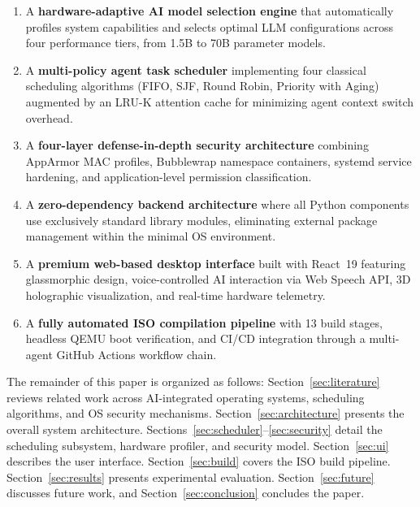 \documentclass[conference]{IEEEtran}
\begin{document}
\begin{enumerate}[label=(\arabic*)]
    \item A \textbf{hardware-adaptive AI model selection engine} that automatically profiles system capabilities and selects optimal LLM configurations across four performance tiers, from 1.5B to 70B parameter models.
    
    \item A \textbf{multi-policy agent task scheduler} implementing four classical scheduling algorithms (FIFO, SJF, Round Robin, Priority with Aging) augmented by an LRU-K attention cache for minimizing agent context switch overhead.
    
    \item A \textbf{four-layer defense-in-depth security architecture} combining AppArmor MAC profiles, Bubblewrap namespace containers, systemd service hardening, and application-level permission classification.
    
    \item A \textbf{zero-dependency backend architecture} where all Python components use exclusively standard library modules, eliminating external package management within the minimal OS environment.
    
    \item A \textbf{premium web-based desktop interface} built with React~19 featuring glassmorphic design, voice-controlled AI interaction via Web Speech API, 3D holographic visualization, and real-time hardware telemetry.
    
    \item A \textbf{fully automated ISO compilation pipeline} with 13 build stages, headless QEMU boot verification, and CI/CD integration through a multi-agent GitHub Actions workflow chain.
\end{enumerate}

The remainder of this paper is organized as follows: Section~\ref{sec:literature} reviews related work across AI-integrated operating systems, scheduling algorithms, and OS security mechanisms. Section~\ref{sec:architecture} presents the overall system architecture. Sections~\ref{sec:scheduler}--\ref{sec:security} detail the scheduling subsystem, hardware profiler, and security model. Section~\ref{sec:ui} describes the user interface. Section~\ref{sec:build} covers the ISO build pipeline. Section~\ref{sec:results} presents experimental evaluation. Section~\ref{sec:future} discusses future work, and Section~\ref{sec:conclusion} concludes the paper.
\end{document}

